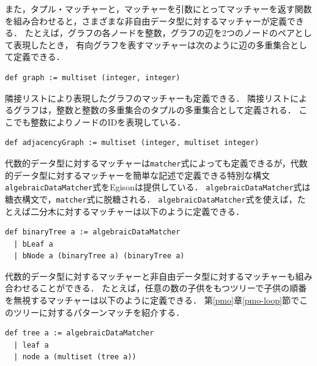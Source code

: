 また，タプル・マッチャーと，マッチャーを引数にとってマッチャーを返す関数を組み合わせると，さまざまな非自由データ型に対するマッチャーが定義できる．
たとえば，グラフの各ノードを整数，グラフの辺を2つのノードのペアとして表現したとき，
有向グラフを表すマッチャーは次のように辺の多重集合として定義できる．
\begin{lstlisting}[language=egison,numbers=none]
def graph := multiset (integer, integer)
\end{lstlisting}
隣接リストにより表現したグラフのマッチャーも定義できる．
隣接リストによるグラフは，整数と整数の多重集合のタプルの多重集合として定義される．
ここでも整数によりノードのIDを表現している．
\begin{lstlisting}[language=egison,numbers=none]
def adjacencyGraph := multiset (integer, multiset integer)
\end{lstlisting}

代数的データ型に対するマッチャーは\lstinline{matcher}式によっても定義できるが，代数的データ型に対するマッチャーを簡単な記述で定義できる特別な構文\lstinline{algebraicDataMatcher}式をEgisonは提供している．
\lstinline{algebraicDataMatcher}式は糖衣構文で，\lstinline{matcher}式に脱糖される．
\lstinline{algebraicDataMatcher}式を使えば，たとえば二分木に対するマッチャーは以下のように定義できる．
\begin{lstlisting}[language=egison,numbers=none]
def binaryTree a := algebraicDataMatcher
  | bLeaf a
  | bNode a (binaryTree a) (binaryTree a)
\end{lstlisting}
代数的データ型に対するマッチャーと非自由データ型に対するマッチャーも組み合わせることができる．
たとえば，任意の数の子供をもつツリーで子供の順番を無視するマッチャーは以下のように定義できる．
第\ref{pmo}章\ref{pmo-loop}節でこのツリーに対するパターンマッチを紹介する．
\begin{lstlisting}[language=egison,numbers=none]
def tree a := algebraicDataMatcher
  | leaf a
  | node a (multiset (tree a))
\end{lstlisting}
